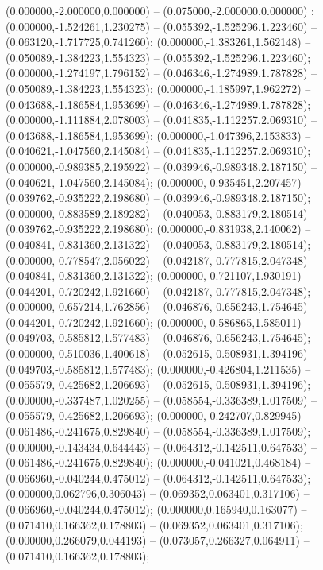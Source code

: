  (0.000000,-2.000000,0.000000) -- (0.075000,-2.000000,0.000000) ;
 (0.000000,-1.524261,1.230275) -- (0.055392,-1.525296,1.223460) -- (0.063120,-1.717725,0.741260);
 (0.000000,-1.383261,1.562148) -- (0.050089,-1.384223,1.554323) -- (0.055392,-1.525296,1.223460);
 (0.000000,-1.274197,1.796152) -- (0.046346,-1.274989,1.787828) -- (0.050089,-1.384223,1.554323);
 (0.000000,-1.185997,1.962272) -- (0.043688,-1.186584,1.953699) -- (0.046346,-1.274989,1.787828);
 (0.000000,-1.111884,2.078003) -- (0.041835,-1.112257,2.069310) -- (0.043688,-1.186584,1.953699);
 (0.000000,-1.047396,2.153833) -- (0.040621,-1.047560,2.145084) -- (0.041835,-1.112257,2.069310);
 (0.000000,-0.989385,2.195922) -- (0.039946,-0.989348,2.187150) -- (0.040621,-1.047560,2.145084);
 (0.000000,-0.935451,2.207457) -- (0.039762,-0.935222,2.198680) -- (0.039946,-0.989348,2.187150);
 (0.000000,-0.883589,2.189282) -- (0.040053,-0.883179,2.180514) -- (0.039762,-0.935222,2.198680);
 (0.000000,-0.831938,2.140062) -- (0.040841,-0.831360,2.131322) -- (0.040053,-0.883179,2.180514);
 (0.000000,-0.778547,2.056022) -- (0.042187,-0.777815,2.047348) -- (0.040841,-0.831360,2.131322);
 (0.000000,-0.721107,1.930191) -- (0.044201,-0.720242,1.921660) -- (0.042187,-0.777815,2.047348);
 (0.000000,-0.657214,1.762856) -- (0.046876,-0.656243,1.754645) -- (0.044201,-0.720242,1.921660);
 (0.000000,-0.586865,1.585011) -- (0.049703,-0.585812,1.577483) -- (0.046876,-0.656243,1.754645);
 (0.000000,-0.510036,1.400618) -- (0.052615,-0.508931,1.394196) -- (0.049703,-0.585812,1.577483);
 (0.000000,-0.426804,1.211535) -- (0.055579,-0.425682,1.206693) -- (0.052615,-0.508931,1.394196);
 (0.000000,-0.337487,1.020255) -- (0.058554,-0.336389,1.017509) -- (0.055579,-0.425682,1.206693);
 (0.000000,-0.242707,0.829945) -- (0.061486,-0.241675,0.829840) -- (0.058554,-0.336389,1.017509);
 (0.000000,-0.143434,0.644443) -- (0.064312,-0.142511,0.647533) -- (0.061486,-0.241675,0.829840);
 (0.000000,-0.041021,0.468184) -- (0.066960,-0.040244,0.475012) -- (0.064312,-0.142511,0.647533);
 (0.000000,0.062796,0.306043) -- (0.069352,0.063401,0.317106) -- (0.066960,-0.040244,0.475012);
 (0.000000,0.165940,0.163077) -- (0.071410,0.166362,0.178803) -- (0.069352,0.063401,0.317106);
 (0.000000,0.266079,0.044193) -- (0.073057,0.266327,0.064911) -- (0.071410,0.166362,0.178803);
